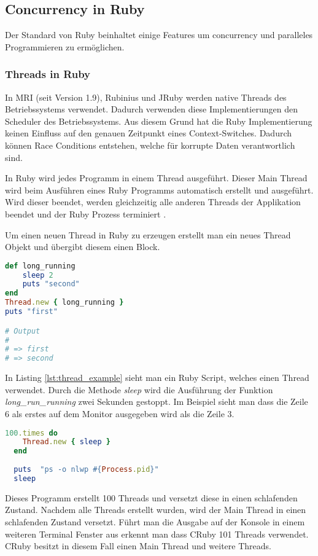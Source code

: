 \subsection{Concurrency in Ruby}
Der Standard von Ruby beinhaltet einige Features um concurrency und paralleles Programmieren zu ermöglichen.

\subsubsection{Threads in Ruby}
In MRI (seit Version 1.9), Rubinius und JRuby werden native Threads des Betriebssystems verwendet. Dadurch verwenden diese Implementierungen den Scheduler des Betriebssystems. Aus diesem Grund hat die Ruby Implementierung keinen Einfluss auf den genauen Zeitpunkt eines Context-Switches. Dadurch können Race Conditions entstehen, welche für korrupte Daten verantwortlich sind.

In Ruby wird jedes Programm in einem Thread ausgeführt. Dieser Main Thread wird beim Ausführen eines Ruby Programms automatisch erstellt und ausgeführt. Wird dieser beendet, werden gleichzeitig alle anderen Threads der Applikation beendet und der Ruby Prozess terminiert \cite[p. 15]{Sto2013}.

Um einen neuen Thread in Ruby zu erzeugen erstellt man ein neues Thread Objekt und übergibt diesem einen Block. 

\begin{lstlisting}[language=Ruby,label=lst:thread_example]
def long_running
	sleep 2
	puts "second"
end
Thread.new { long_running }
puts "first"

# Output
#
# => first
# => second

\end{lstlisting}

In Listing \ref{lst:thread_example} sieht man ein Ruby Script, welches einen Thread verwendet. Durch die Methode \emph{sleep} wird die Ausführung der Funktion \textit{long\_run\_running} zwei Sekunden gestoppt. Im Beispiel sieht man dass die Zeile 6 als erstes auf dem Monitor ausgegeben wird als die Zeile 3. 

\begin{lstlisting}[language=Ruby,caption=Adaptiert von \cite{Sto2013}]
  100.times do
    Thread.new { sleep }
  end
  
  puts  "ps -o nlwp #{Process.pid}"
  sleep
\end{lstlisting} 

Dieses Programm erstellt 100 Threads und versetzt diese in einen schlafenden Zustand. Nachdem alle Threads erstellt wurden, wird der Main Thread in einen schlafenden Zustand versetzt. Führt man die Ausgabe auf der Konsole in einem weiteren Terminal Fenster aus erkennt man dass CRuby 101 Threads verwendet. CRuby besitzt in diesem Fall einen Main Thread und weitere Threads.

